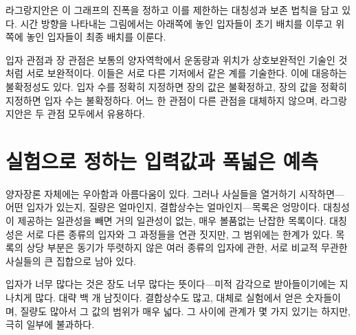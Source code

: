 라그랑지안은 이 그래프의 진폭을 정하고 이를 제한하는 대칭성과 보존 법칙을 담고 있다. 시간 방향을 나타내는 그림에서는 아래쪽에 놓인 입자들이 초기 배치를 이루고 위쪽에 놓인 입자들이 최종 배치를 이룬다.

\begin{classroomqa}
\end{classroomqa}

입자 관점과 장 관점은 보통의 양자역학에서 운동량과 위치가 상호보완적인 기술인 것처럼 서로 보완적이다. 이들은 서로 다른 기저에서 같은 계를 기술한다. 이에 대응하는 불확정성도 있다. 입자 수를 정확히 지정하면 장의 값은 불확정하고, 장의 값을 정확히 지정하면 입자 수는 불확정하다. 어느 한 관점이 다른 관점을 대체하지 않으며, 라그랑지안은 두 관점 모두에서 유용하다.

\begin{classroomqa}
\end{classroomqa}

\section{실험으로 정하는 입력값과 폭넓은 예측}

양자장론 자체에는 우아함과 아름다움이 있다. 그러나 사실들을 열거하기 시작하면---어떤 입자가 있는지, 질량은 얼마인지, 결합상수는 얼마인지---목록은 엉망이다. 대칭성이 제공하는 일관성을 빼면 거의 일관성이 없는, 매우 볼품없는 난잡한 목록이다. 대칭성은 서로 다른 종류의 입자와 그 과정들을 연관 짓지만, 그 범위에는 한계가 있다. 목록의 상당 부분은 동기가 뚜렷하지 않은 여러 종류의 입자에 관한, 서로 비교적 무관한 사실들의 큰 집합으로 남아 있다.

\begin{classroomqa}
\end{classroomqa}

입자가 너무 많다는 것은 장도 너무 많다는 뜻이다---미적 감각으로 받아들이기에는 지나치게 많다. 대략 백 개 남짓이다. 결합상수도 많고, 대체로 실험에서 얻은 숫자들이며, 질량도 많아서 그 값의 범위가 매우 넓다. 그 사이에 관계가 몇 가지 있기는 하지만, 극히 일부에 불과하다.

